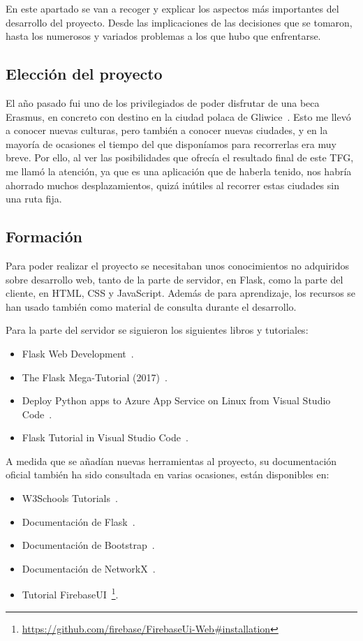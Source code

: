 
En este apartado se van a recoger y explicar los aspectos más importantes del desarrollo del proyecto. Desde las implicaciones de las decisiones que se tomaron, hasta los numerosos y variados problemas a los que hubo que enfrentarse.

\subsection{Elección del proyecto}

El año pasado fui uno de los privilegiados de poder disfrutar de una beca Erasmus, en concreto con destino en la ciudad polaca de Gliwice~\cite{wiki:gliwice}.
Esto me llevó a conocer nuevas culturas, pero también a conocer nuevas ciudades, y en la mayoría de ocasiones el tiempo del que disponíamos para recorrerlas era muy breve. Por ello, al ver las posibilidades que ofrecía el resultado final de este TFG, me llamó la atención, ya que es una aplicación que de haberla tenido, nos habría ahorrado muchos desplazamientos, quizá inútiles al recorrer estas ciudades sin una ruta fija.

\subsection{Formación}

Para poder realizar el proyecto se necesitaban unos conocimientos no adquiridos sobre desarrollo web, tanto de la parte de servidor, en Flask, como la parte del cliente, en HTML, CSS y JavaScript. Además de para aprendizaje, los recursos se han usado también como material de consulta durante el desarrollo.

Para la parte del servidor se siguieron los siguientes libros y tutoriales:
\begin{itemize}
	\item Flask Web Development~\cite{grinberg2014flask}.
	\item The Flask Mega-Tutorial (2017)~\cite{grinberg-mega}.
	\item Deploy Python apps to Azure App Service on Linux from Visual Studio Code~\cite{deploy-flask-azure}.
	\item Flask Tutorial in Visual Studio Code~\cite{vscode-flask}.
\end{itemize}


A medida que se añadían nuevas herramientas al proyecto, su documentación
oficial también ha sido consultada en varias ocasiones, están disponibles en:
\begin{itemize}
	\item W3Schools Tutorials~\cite{w3schools}.
	\item Documentación de Flask~\cite{doc:flask}.
	\item Documentación de Bootstrap~\cite{doc:bootstrap}.
	\item Documentación de NetworkX~\cite{SciPyProceedings_11}.
	\item Tutorial FirebaseUI~\footnote{\url{https://github.com/firebase/FirebaseUi-Web\#installation}}.
\end{itemize}


